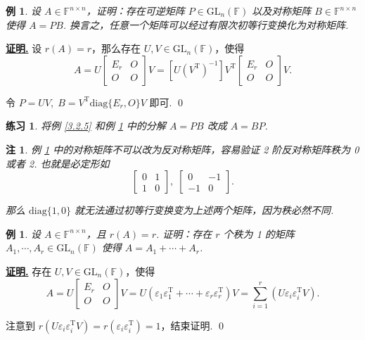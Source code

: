\documentclass[10pt,openany]{article}
\theoremstyle{thmstyle} %
\newtheorem{practice}{练习}[section]
\theoremstyle{defstyle} %
\theoremstyle{prostyle} %
\theoremstyle{exastyle}
\newtheorem{example}[theorem]{例}
\theoremstyle{remstyle}
\newtheorem{remark}[theorem]{注}
\renewenvironment{proof}[1][证明]{\par\underline{\textbf{#1.}} \;\fangsong}{\qed\par}
\newcommand{\T}{^{\text{T}}}
\newcommand{\F}{\mathbb{F}}
\newcommand{\gfn}{\text{GL}_n(\mathbb{F})}
\newcommand{\n}{^{n \times n}}
\newcommand{\diag}{\mathrm{diag}}
\begin{document}
\begin{example} \label{3.2.6}
	设 \( A \in \F\n \)，证明：存在可逆矩阵 \( P \in \gfn \) 以及对称矩阵 \( B \in \F\n \) 使得 \( A=PB \). 换言之，任意一个矩阵可以经过有限次初等行变换化为对称矩阵.
\end{example}

\begin{proof}
	设 \( r(A)=r \)，那么存在 \( U,V \in \gfn \)，使得 
	\[ A=U\begin{bmatrix}
		E_r & O \\ O & O
	\end{bmatrix}V=[U(V\T)^{-1}]V\T\begin{bmatrix}
		E_r & O \\ O & O
	\end{bmatrix}V. \]
	
	令 \( P=UV, \; B=V\T \diag\{E_r,O\}V \) 即可. 
\end{proof}

\begin{practice}
	将例 \ref{3.2.5} 和例 \ref{3.2.6} 中的分解 \( A=PB \) 改成 \( A=BP \).
\end{practice}

\begin{remark}
	例 \ref{3.2.6} 中的对称矩阵不可以改为反对称矩阵，容易验证 2 阶反对称矩阵秩为 0 或者 2. 也就是必定形如
	\[ \begin{bmatrix}
		0 & 1 \\ 1 & 0
	\end{bmatrix}, \; \begin{bmatrix}
	0 & -1 \\ -1 & 0
	\end{bmatrix}. \]
	
	那么 \( \diag\{1,0\} \) 就无法通过初等行变换变为上述两个矩阵，因为秩必然不同.
\end{remark}

\begin{example} \label{3.2.8}
	设 \( A \in \F\n \)，且  \( r(A)=r \). 证明：存在 \( r \) 个秩为 1 的矩阵 \( A_1,\cdots,A_r \in \gfn \) 使得 \( A=A_1+\cdots+A_r \).
\end{example}

\begin{proof}
	存在 \( U,V \in \gfn \)，使得 
	\[ A=U\begin{bmatrix}
		E_r & O \\ O & O
	\end{bmatrix}V=U(\varepsilon_1\varepsilon_1\T+\cdots+\varepsilon_r\varepsilon_r\T)V=\sum_{i=1}^{r} (U\varepsilon_i\varepsilon_i\T V). \]
	
	注意到 \( r(U\varepsilon_i\varepsilon_i\T V)=r(\varepsilon_i\varepsilon_i\T)=1 \)，结束证明.
\end{proof}
\end{document}
